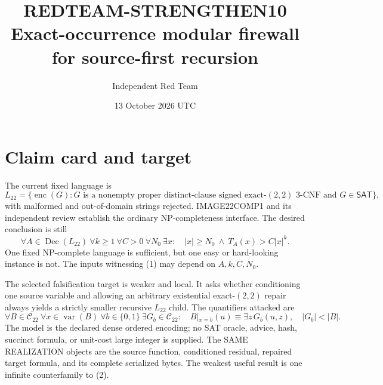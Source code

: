 \documentclass[11pt]{article}
\title{REDTEAM-STRENGTHEN10\\\large Exact-occurrence modular firewall for source-first recursion}
\author{Independent Red Team}
\date{13 October 2026 UTC}
\newcommand{\SAT}{\mathsf{SAT}}
\newcommand{\Ltwo}{L_{22}}
\newcommand{\enc}{\operatorname{enc}}
\begin{document}
\maketitle

\begin{center}
\end{center}

\section{Claim card and target}
The current fixed language is
\[
 \Ltwo=\{\enc(G):G\text{ is a nonempty proper distinct-clause signed
 exact-$(2,2)$ 3-CNF and }G\in\SAT\},
\]
with malformed and out-of-domain strings rejected.  IMAGE22COMP1 and its
independent review establish the ordinary NP-completeness interface.  The
desired conclusion is still
\[
 \forall A\in\operatorname{Dec}(\Ltwo)\ \forall k\ge1\ \forall C>0\
 \forall N_0\ \exists x:\quad |x|\ge N_0\ \wedge\
 T_A(x)>C|x|^k.                                             \tag{1}
\]
One fixed NP-complete language is sufficient, but one easy or hard-looking
instance is not.  The inputs witnessing (1) may depend on $A,k,C,N_0$.

The selected falsification target is weaker and local.  It asks whether
conditioning one source variable and allowing an arbitrary existential
exact-$(2,2)$ repair always yields a strictly smaller recursive $\Ltwo$
child.  The quantifiers attacked are
\[
 \forall B\in\mathcal C_{22}\ \forall x\in\operatorname{var}(B)\
 \forall b\in\{0,1\}\ \exists G_b\in\mathcal C_{22}:\quad
 B|_{x=b}(u)\equiv\exists z\,G_b(u,z),\quad |G_b|<|B|.       \tag{2}
\]
The model is the declared dense ordered encoding; no SAT oracle, advice,
hash, succinct formula, or unit-cost large integer is supplied.  The SAME
REALIZATION objects are the source function, conditioned residual, repaired
target formula, and its complete serialized bytes.  The weakest useful
result is one infinite counterfamily to (2).
\end{document}
